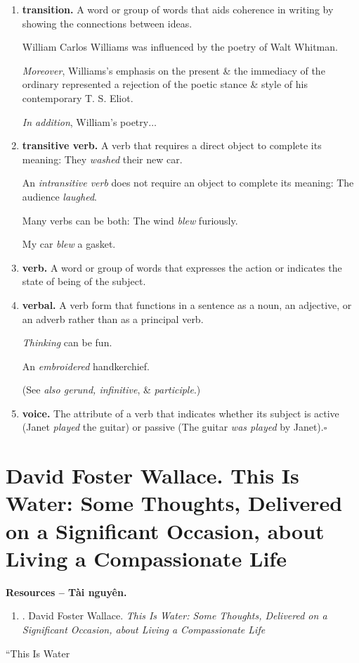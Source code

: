\documentclass{article}
\begin{document}
\begin{enumerate}
	{\it Saw, see, will see}.
	\item {\bf transition.} A word or group of words that aids coherence in writing by showing the connections between ideas.
	
	William Carlos Williams was influenced by the poetry of Walt Whitman.
	
	{\it Moreover}, Williams's emphasis on the present \& the immediacy of the ordinary represented a rejection of the poetic stance \& style of his contemporary T. S. Eliot.
	
	{\it In addition}, William's poetry$\ldots$
	\item {\bf transitive verb.} A verb that requires a direct object to complete its meaning: They {\it washed} their new car.
	
	An {\it intransitive verb} does not require an object to complete its meaning: The audience {\it laughed}.
	
	Many verbs can be both: The wind {\it blew} furiously.
	
	My car {\it blew} a gasket.
	\item {\bf verb.} A word or group of words that expresses the action or indicates the state of being of the subject.
	
	\item {\bf verbal.} A verb form that functions in a sentence as a noun, an adjective, or an adverb rather than as a principal verb.
	
	{\it Thinking} can be fun.
	
	An {\it embroidered} handkerchief.
	
	(See {\it also gerund, infinitive}, \& {\it participle}.)
	\item {\bf voice.} The attribute of a verb that indicates whether its subject is active (Janet {\it played} the guitar) or passive (The guitar {\it was played} by Janet).\hfill$\square$
\end{enumerate}


\section{{\sc David Foster Wallace}. This Is Water: Some Thoughts, Delivered on a Significant Occasion, about Living a Compassionate Life}
\textbf{\textsf{Resources -- Tài nguyên.}}
\begin{enumerate}
	\item \cite{Wallace_water}. {\sc David Foster Wallace}. {\it This Is Water: Some Thoughts, Delivered on a Significant Occasion, about Living a Compassionate Life}
\end{enumerate}
``This Is Water
\end{document}
